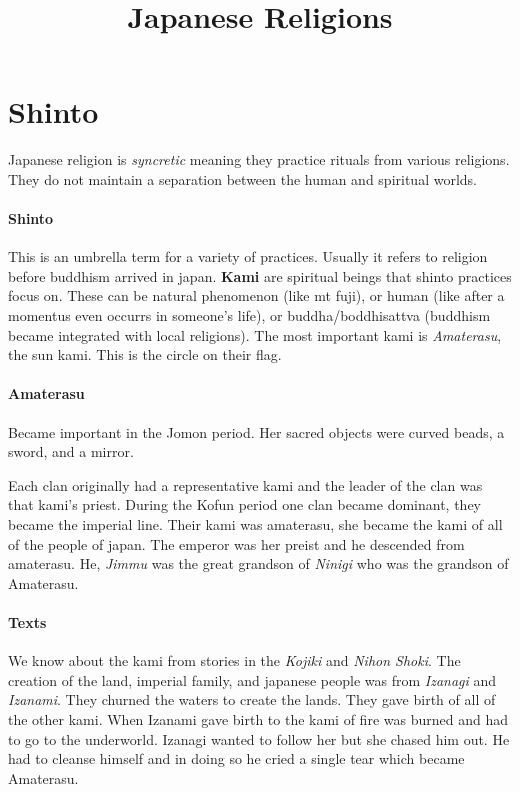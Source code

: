 \documentclass{article}
\begin{document}
\title{Japanese Religions}
\maketitle

\section*{Shinto}
\label{sec:shinto}
Japanese religion is \emph{syncretic} meaning they practice rituals from various religions. They do not maintain a separation between the human and spiritual worlds.

\paragraph{Shinto}
\label{par:shinto}
This is an umbrella term for a variety of practices. Usually it refers to religion before buddhism arrived in japan. \textbf{Kami} are spiritual beings that shinto practices focus on. These can be natural phenomenon (like mt fuji), or human (like after a momentus even occurrs in someone's life), or buddha/boddhisattva (buddhism became integrated with local religions). The most important kami is \emph{Amaterasu}, the sun kami. This is the circle on their flag.

\paragraph{Amaterasu}
\label{par:amaterasu}
Became important in the Jomon period. Her sacred objects were curved beads, a sword, and a mirror.

Each clan originally had a representative kami and the leader of the clan was that kami's priest. During the Kofun period one clan became dominant, they became the imperial line. Their kami was amaterasu, she became the kami of all of the people of japan. The emperor was her preist and he descended from amaterasu. He, \emph{Jimmu} was the great grandson of \emph{Ninigi} who was the grandson of Amaterasu.

\paragraph{Texts}
\label{par:texts}
We know about the kami from stories in the \emph{Kojiki} and \emph{Nihon Shoki}. The creation of the land, imperial family, and japanese people was from \emph{Izanagi} and \emph{Izanami}. They churned the waters to create the lands. They gave birth of all of the other kami. When Izanami gave birth to the kami of fire was burned and had to go to the underworld. Izanagi wanted to follow her but she chased him out. He had to cleanse himself and in doing so he cried a single tear which became Amaterasu.
\end{document}
